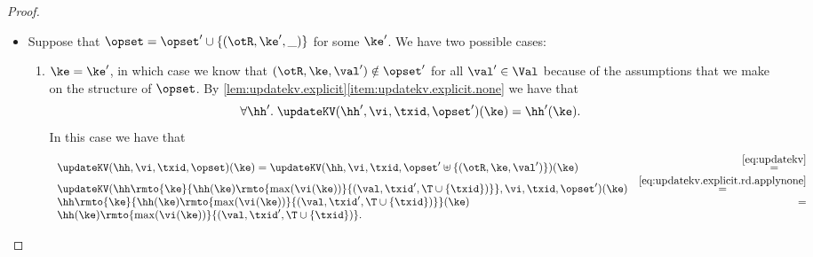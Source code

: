 \begin{proof}
\begin{enumerate}
\begin{itemize}
		\item Suppose that $\opset = \opset' \cup \{(\otR, \ke', \_)\}$ for some $\ke'$. We have two possible cases: 
			\begin{enumerate}
			\item $\ke = \ke'$, in which case we know that $(\otR, \ke, \val') \notin \opset'$ for all $\val' \in \Val$ because of 
			the assumptions that we make on the structure of $\opset$. By \cref{lem:updatekv.explicit}\eqref{item:updatekv.explicit.none} we have that
			\begin{equation}
			\forall \hh'.\; \updateKV(\hh', \vi, \txid, \opset')(\ke) = \hh'(\ke).
			\label{eq:updatekv.explicit.rd.applynone}
			\end{equation}
			In this case we have that 
			\[
			\begin{array}{lr}
			\updateKV(\hh, \vi, \txid, \opset)(\ke) = \updateKV(\hh,\vi, \txid, \opset' \uplus \{(\otR, \ke, \val')\})(\ke) &\stackrel{\eqref{eq:updatekv}}{=}\\
			\updateKV(\hh\rmto{\ke}{\hh(\ke)\rmto{\max(\vi(\ke))}{(\val, \txid', \T \cup \{\txid\})}}, \vi, \txid, \opset')(\ke) &\stackrel{\eqref{eq:updatekv.explicit.rd.applynone}}{=} \\
			\hh\rmto{\ke}{\hh(\ke)\rmto{\max(\vi(\ke))}{(\val, \txid', \T \cup \{\txid\})}}(\ke) &=\\ 
			\hh(\ke)\rmto{\max(\vi(\ke))}{(\val, \txid', \T \cup \{\txid\})}.
			\end{array}
			\]


\end{enumerate}
\end{itemize}
\end{enumerate}
\end{proof}

